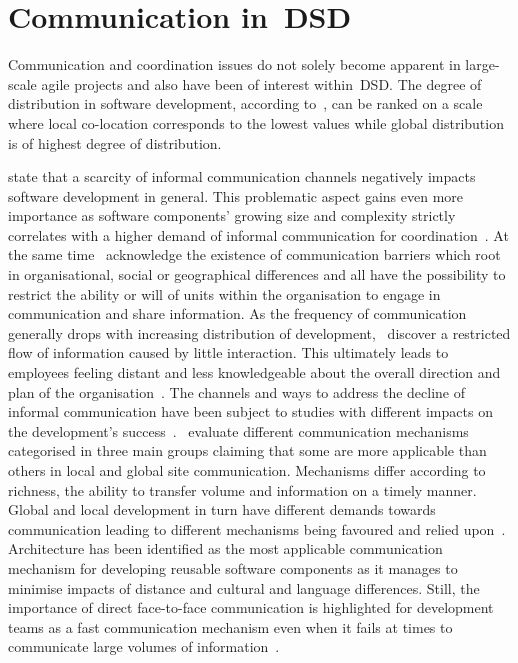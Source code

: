 \section{Communication in~\acl{DSD}}

Communication and coordination issues do not solely become apparent in large-scale agile projects and also have been of interest within~\ac{DSD}. The degree of distribution in software development, according to~\citet{cockburn2007agile}, can be ranked on a scale where local co-location corresponds to the lowest values while global distribution is of highest degree of distribution.

\citet{curtis1988fieldstudysoftwaredesign} state that a scarcity of informal communication channels negatively impacts software development in general. This problematic aspect gains even more importance as software components' growing size and complexity strictly correlates with a higher demand of informal communication for coordination~\citep{kraut1995coordinationinsd}. At the same time~\citet{kraut1995coordinationinsd} acknowledge the existence of communication barriers which root in organisational, social or geographical differences and all have the possibility to restrict the ability or will of units within the organisation to engage in communication and share information. As the frequency of communication generally drops with increasing distribution of development,~\citet{herbsleb2003empiricalcommunication} discover a restricted flow of information caused by little interaction. This ultimately leads to employees feeling distant and less knowledgeable about the overall direction and plan of the organisation~\citep{herbsleb2003empiricalcommunication}. The channels and ways to address the decline of informal communication have been subject to studies with different impacts on the development's success~\citep{niinimaeki2008im, smite2006comm}.~\citet{rbs2012softwarearchitecture} evaluate different communication mechanisms categorised in three main groups claiming that some are more applicable than others in local and global site communication. Mechanisms differ according to richness, the ability to transfer volume and information on a timely manner. Global and local development in turn have different demands towards communication leading to different mechanisms being favoured and relied upon~\citep{rbs2012softwarearchitecture}. Architecture has been identified as the most applicable communication mechanism for developing reusable software components as it manages to minimise impacts of distance and cultural and language differences. Still, the importance of direct face-to-face communication is highlighted for development teams as a fast communication mechanism even when it fails at times to communicate large volumes of information~\citep{rbs2012softwarearchitecture}.

